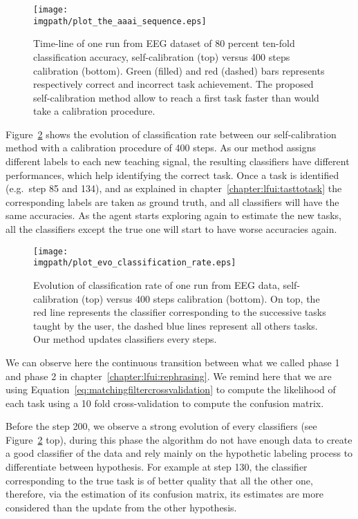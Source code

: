 \begin{figure}[!ht]
\centering
\texttt{[image: \\imgpath/plot\_the\_aaai\_sequence.eps]}
\caption{Time-line of one run from EEG dataset of $80$ percent ten-fold classification accuracy, self-calibration (top) versus 400 steps calibration (bottom). Green (filled) and red (dashed) bars represents respectively correct and incorrect task achievement. The proposed self-calibration method allow to reach a first task faster than would take a calibration procedure.}
\label{fig:sequence}
\end{figure} 


Figure~\ref{fig:sequence_evolution} shows the evolution of classification rate between our self-calibration method with a calibration procedure of 400 steps. As our method assigns different labels to each new teaching signal, the resulting classifiers have different performances, which help identifying the correct task. Once a task is identified (e.g.\ step 85 and 134), and as explained in chapter~\ref{chapter:lfui:tasttotask} the corresponding labels are taken as ground truth, and all classifiers will have the same accuracies. As the agent starts exploring again to estimate the new tasks, all the classifiers except the true one will start to have worse accuracies again.

\begin{figure}[!ht]
\centering
\texttt{[image: \\imgpath/plot\_evo\_classification\_rate.eps]}
\caption{Evolution of classification rate of one run from EEG data, self-calibration (top) versus 400 steps calibration (bottom). On top, the red line represents the classifier corresponding to the successive tasks taught by the user, the dashed blue lines represent all others tasks. Our method updates classifiers every steps.}
\label{fig:sequence_evolution}
\end{figure} 

We can observe here the continuous transition between what we called phase 1 and phase 2 in chapter~\ref{chapter:lfui:rephrasing}. We remind here that we are using Equation~\ref{eq:matchingfiltercrossvalidation} to compute the likelihood of each task using a 10 fold cross-validation to compute the confusion matrix.

Before the step 200, we observe a strong evolution of every classifiers (see Figure~\ref{fig:sequence_evolution} top), during this phase the algorithm do not have enough data to create a good classifier of the data and rely mainly on the hypothetic labeling process to differentiate between hypothesis. For example at step 130, the classifier corresponding to the true task is of better quality that all the other one, therefore, via the estimation of its confusion matrix, its estimates are more considered than the update from the other hypothesis. 

